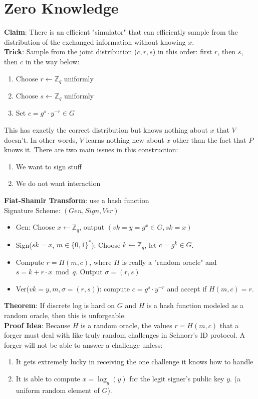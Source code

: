 \documentclass{scribe}
\begin{document}
\section{Zero Knowledge}
\textbf{Claim}: There is an efficient "simulator" that can efficiently sample from the distribution of the exchanged information without knowing $x$.
\\
\textbf{Trick}: Sample from the joint distribution ($c,r,s$) in this order: first $r$, then $s$, then $c$ in the way below:
\begin{enumerate}
    \item Choose $r \leftarrow \mathbb{Z}_q$ uniformly
    \item Choose $s \leftarrow \mathbb{Z}_q$ uniformly
    \item Set $c = g^s \cdot y^{-r} \in G$
\end{enumerate}
This has exactly the correct distribution but knows nothing about $x$ that $V$ doesn't.
In other words, $V$ learns nothing new about $x$ other than the fact that $P$ knows it.
\vspace{5mm}
There are two main issues in this construction:
\begin{enumerate}
    \item We want to sign stuff
    \item We do not want interaction
\end{enumerate}
\textbf{Fiat-Shamir Transform}: use a hash function
\\
Signature Scheme: $(Gen,Sign,Ver)$
\begin{itemize}
    \item Gen: Choose $x \leftarrow \mathbb{Z}_q$, output $(vk = y = g^x \in G, sk=x)$
    \item Sign($sk=x$, $m \in \{0,1\}^*$): Choose $k \leftarrow \mathbb{Z}_q$, let $c = g^k \in G$.
    \item Compute $r = H(m,c)$, where $H$ is really a "random oracle" and $s = k+r \cdot x \bmod q$. Output $\sigma = (r,s)$
    \item Ver($vk = y, m, \sigma = (r,s)$): compute $c = g^s \cdot y^{-r}$ and accept if $H(m,c) = r$.
\end{itemize}
\textbf{Theorem}: If discrete log is hard on $G$ and $H$ is a hash function modeled as a random oracle, then this is unforgeable.
\\
\textbf{Proof Idea}: Because $H$ is a random oracle, the values $r=H(m,c)$ that a forger must deal with like truly random challenges in Schnorr's ID protocol. A forger will not be able to answer a challenge unless:
\begin{enumerate}
    \item It gets extremely lucky in receiving the one challenge it knows how to handle
    \item It is able to compute $x=\log_{g}(y)$ for the legit signer's public key $y$. (a uniform random element of $G$).
\end{enumerate} 
\end{document}
